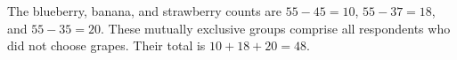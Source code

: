 The blueberry, banana, and strawberry counts are $55-45=10$, $55-37=18$, and $55-35=20$. These mutually exclusive groups comprise all respondents who did not choose grapes. Their total is $10+18+20=\boxed{48}$.
